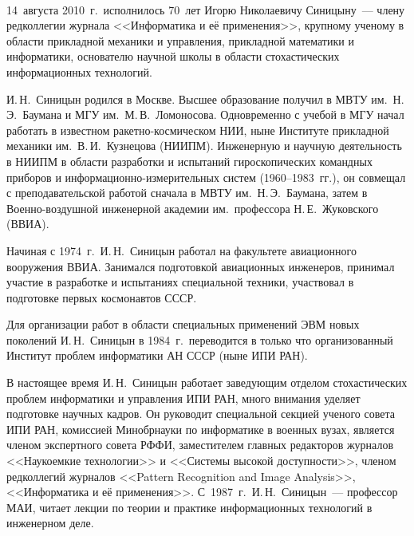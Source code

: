       \begin{multicols}{2}

      \label{st\stat}
      
 \begin{center}
\mbox{%
\epsfxsize=50mm
}
\end{center}
\vspace*{4pt}

\bigskip



      14~августа 2010~г.\ исполнилось 70~лет Игорю Николаевичу Синицыну~--- члену 
редколлегии журнала <<Информатика и её применения>>, крупному ученому в области 
прикладной механики и управ\-ле\-ния, прикладной математики и информатики, основателю 
научной школы в области стохастических информационных технологий.
      
      И.\,Н.~Синицын родился в Москве. Высшее образование получил в МВТУ им.\ 
Н.\,Э.~Баумана и МГУ им.\ М.\,В.~Ломоносова. Одновременно с учебой в МГУ начал работать 
в известном ра\-кет\-но-кос\-ми\-че\-ском НИИ, ныне Институте прикладной механики им.\ 
В.\,И.~Кузнецова (НИИПМ). Инженерную и научную деятельность в НИИПМ в области 
разработки и испытаний гироскопических командных приборов и 
      ин\-фор\-ма\-ци\-он\-но-из\-ме\-ри\-тель\-ных систем (1960--1983~гг.), он совмещал с 
преподавательской работой сначала в МВТУ им.\ Н.\,Э.~Баумана, затем в 
      Воен\-но-воз\-душ\-ной инженерной академии им.\ профессора Н.\,Е.~Жуковского 
(ВВИА).
      
      Начиная с 1974~г.\ И.\,Н.~Синицын работал на факультете авиационного вооружения 
ВВИА. Занимался подготовкой авиационных инженеров, принимал участие в разработке и 
испытаниях\linebreak
 специальной техники, участвовал в подготовке первых космонавтов СССР.
      
      Для организации работ в области специальных применений ЭВМ новых поколений 
И.\,Н.~Синицын в 1984~г.\ переводится в только что организованный Институт проблем 
информатики АН СССР (ныне ИПИ РАН).
      
      В настоящее время И.\,Н.~Синицын работает заведующим отделом стохастических 
проблем информатики и управления ИПИ РАН, много внимания уделяет подготовке научных 
кадров. Он руководит специальной секцией ученого совета ИПИ РАН, комиссией Минобрнауки 
по информатике в военных вузах, является членом экспертного совета РФФИ, заместителем 
главных редакторов журналов <<Наукоемкие технологии>> и <<Системы высокой 
доступности>>, членом редколлегий журналов <<Pattern Recognition and Image Analysis>>, 
<<Информатика и её применения>>. С~1987~г.\ И.\,Н.~Синицын~--- профессор МАИ, читает 
лекции по теории и практике информационных технологий в инженерном деле. 
     

\end{multicols}
